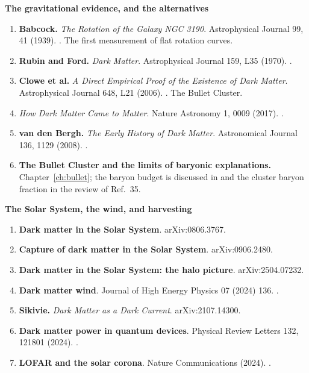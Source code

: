 \vspace{8pt}
{\sffamily\bfseries\small The gravitational evidence, and the alternatives}

\begin{enumerate}[leftmargin=1.4em,itemsep=4pt,start=52]
\item \textbf{Babcock.} \emph{The Rotation of the Galaxy NGC 3190}.
Astrophysical Journal 99, 41 (1939).
. The first measurement of
flat rotation curves.
\item \textbf{Rubin and Ford.} \emph{Dark Matter}. Astrophysical Journal
159, L35 (1970). .
\item \textbf{Clowe et al.} \emph{A Direct Empirical Proof of the Existence of
Dark Matter}. Astrophysical Journal 648, L21 (2006).
. The Bullet Cluster.
\item \emph{How Dark Matter Came to Matter}. Nature Astronomy 1, 0009 (2017).
.
\item \textbf{van den Bergh.} \emph{The Early History of Dark Matter}.
Astronomical Journal 136, 1129 (2008).
.
\item \textbf{The Bullet Cluster and the limits of baryonic explanations.}
Chapter~\ref{ch:bullet}; the baryon budget is discussed in
 and the cluster baryon fraction in the
review of Ref.~35.
\end{enumerate}

\vspace{8pt}
{\sffamily\bfseries\small The Solar System, the wind, and harvesting}

\begin{enumerate}[leftmargin=1.4em,itemsep=4pt,start=58]
\item \textbf{Dark matter in the Solar System}. arXiv:0806.3767.
\item \textbf{Capture of dark matter in the Solar System}. arXiv:0906.2480.
\item \textbf{Dark matter in the Solar System: the halo picture}.
arXiv:2504.07232.
\item \textbf{Dark matter wind}. Journal of High Energy Physics 07 (2024)
136. .
\item \textbf{Sikivie.} \emph{Dark Matter as a Dark Current}. arXiv:2107.14300.
\item \textbf{Dark matter power in quantum devices}. Physical Review Letters
132, 121801 (2024). .
\item \textbf{LOFAR and the solar corona}. Nature Communications (2024).
.
\end{enumerate}

